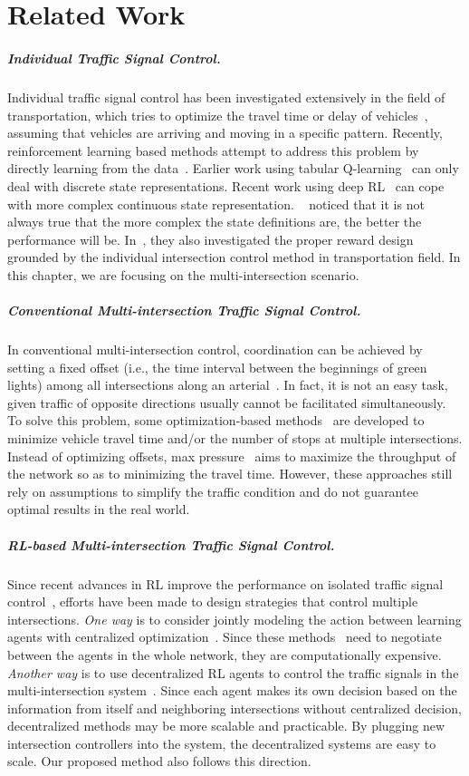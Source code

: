 \section{Related Work}
\subparagraph{\textbf{Individual Traffic Signal Control.}}
Individual traffic signal control has been investigated extensively in the field of transportation, which tries to optimize the travel time or delay of vehicles~\cite{Gart83,Henr84,Boil06,SeHe97,Liang18}, assuming that vehicles are arriving and moving in a specific pattern. Recently, reinforcement learning based methods attempt to address this problem by directly learning from the data~\cite{Wier00,MaDH16}. Earlier work using tabular Q-learning~\cite{APK03,ElAb10} can only deal with discrete state representations. Recent work using deep RL~\cite{liLW16,VaOl16,wei2018intellilight,ZXZF+19,MSCH17,Casa17PG} can cope with more complex continuous state representation. ~\cite{ZZXW+19} noticed that it is not always true that the more complex the state definitions are, the better the performance will be. In~\cite{ZZXW+19}, they also investigated the proper reward design grounded by the individual intersection control method in transportation field. In this chapter, we are focusing on the multi-intersection scenario.

\subparagraph{\textbf{Conventional Multi-intersection Traffic Signal Control.}}
In conventional multi-intersection control, coordination can be achieved by setting a fixed offset (i.e., the time interval between the beginnings of green lights) among all intersections along an arterial~\cite{urbanik2015signal}. In fact, it is not an easy task, given traffic of opposite directions usually cannot be facilitated simultaneously. To solve this problem, some optimization-based methods~\cite{robertson1969transyt,little1981maxband} are developed to minimize vehicle travel time and/or the number of stops at multiple intersections. Instead of optimizing offsets, max pressure~\cite{MP13,MP13book} aims to maximize the throughput of the network so as to minimizing the travel time. However, these approaches still rely on assumptions to simplify the traffic condition and do not guarantee optimal results in the real world.

\subparagraph{\textbf{RL-based Multi-intersection Traffic Signal Control.}}
Since recent advances in RL improve the performance on isolated traffic signal control~\cite{wei2018intellilight,ZZXW+19}, efforts have been made to design strategies that control multiple intersections. \textit{One way} is to consider jointly modeling the action between learning agents with centralized optimization~\cite{KWBV08,VaOl16}. Since these methods~\cite{KWBV08,VaOl16} need to negotiate between the agents in the whole network, they are computationally expensive. \textit{Another way} is to use decentralized RL agents to control the traffic signals in the multi-intersection system~\cite{ElAA13,ALUK10,da2006adaptive}. Since each agent makes its own decision based on the information from itself and neighboring intersections without centralized decision, decentralized methods may be more scalable and practicable. By plugging new intersection controllers into the system, the decentralized systems are easy to scale. Our proposed method also follows this direction. 

